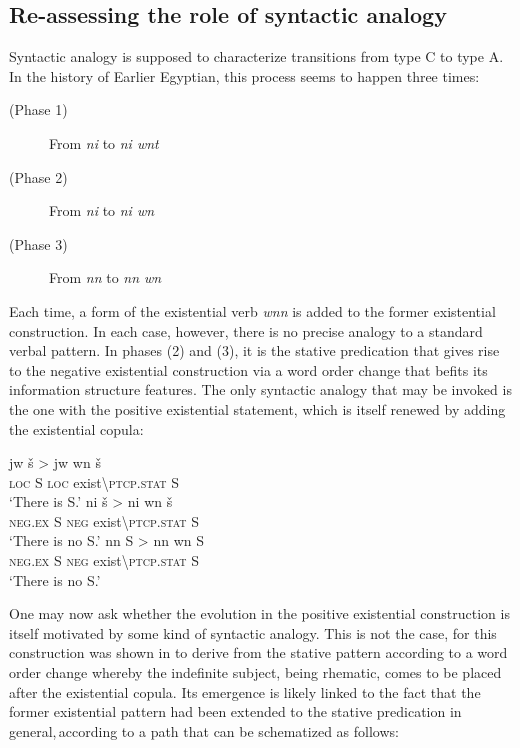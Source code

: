 \documentclass[output=paper]{langsci/langscibook}
\newcommand{\ꜥ}{ʿ}
\newcommand{\ꜣ}{\kern-.25pt\texttt{ꜣ}\kern-.6pt}
\begin{document}
\subsection{Re-assessing the role of syntactic analogy}\label{s:AE4-1}

Syntactic analogy is supposed to characterize transitions from type C to type A. In the history of Earlier Egyptian, this process seems to happen three times:

\begin{description}
    \item[(Phase 1)] From \textit{ni} to \textit{ni wnt}
    \item[(Phase 2)] From \textit{ni} to \textit{ni wn} 
    \item[(Phase 3)] From \textit{nn} to \textit{nn wn} 
\end{description}
 
Each time, a form of the existential verb \textit{wnn} is added to the former existential construction. In each case, however, there is no precise analogy to a standard verbal pattern. In phases (2) and (3), it is the stative predication that gives rise to the negative existential construction via a word order change that befits its information structure features. The only syntactic analogy that may be invoked is the one with the positive existential statement, which is itself renewed by adding the existential copula:  

\ea 
    \ea \label{ex:AE53a}
    \gll jw š > jw wn š\\
    \textsc{loc} S { } \textsc{loc} exist\textbackslash\textsc{ptcp.stat} S\\ 
    \glt ‘There is S.’ 
    \ex \label{ex:AE53b}
    \gll ni š > ni wn š\\
    \textsc{neg.ex} S { } \textsc{neg} exist\textbackslash\textsc{ptcp.stat} S\\
    \glt ‘There is no S.’ 
    \ex \label{ex:AE53ac}
    \glt nn S > nn wn S\\ 
    \textsc{neg.ex} S { } \textsc{neg} exist\textbackslash\textsc{ptcp.stat} S\\ 
    \glt ‘There is no S.’
\z \z


One may now ask whether the evolution in the positive existential construction is itself motivated by some kind of syntactic analogy. This is not the case, for this construction was shown in  to derive from the stative pattern according to a word order change whereby the indefinite subject, being rhematic, comes to be placed after the existential copula. Its emergence is likely linked to the fact that the former existential pattern had been extended to the stative predication in general, according to a path that can be schematized as follows:
\end{document}
